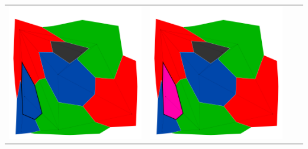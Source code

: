 \documentclass[10pt,a4paper]{article}
\begin{document}
\begin{tabular}{c c c c }
	\includegraphics[scale=.10]{../results/backtracking_simple/map_build/bt_simple_I00015.pdf}&
	\includegraphics[scale=.10]{../results/backtracking_simple/map_build/bt_simple_I00016.pdf}\\
	

\end{tabular}
\end{document}
